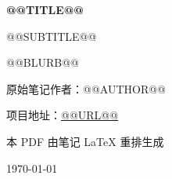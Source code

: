\documentclass[UTF8,11pt,openany,papersize=a4]{ctexbook}
\theoremstyle{definition}
\theoremstyle{plain}
\theoremstyle{remark}
\begin{document}
\begin{titlepage}
\centering
\vspace*{3cm}
{\Huge\bfseries\sffamily @@TITLE@@\par}
\vspace{0.8cm}
{\LARGE\sffamily @@SUBTITLE@@\par}
\vspace{1.5cm}
{\large @@BLURB@@\par}
\vfill
{\large 原始笔记作者：@@AUTHOR@@\par}
\vspace{0.3cm}
{\large 项目地址：\url{@@URL@@}\par}
\vspace{0.3cm}
{\large 本 PDF 由笔记 LaTeX 重排生成\par}
\vspace{0.8cm}
{\large \today\par}
\end{titlepage}

\frontmatter
\pagestyle{fancy}
\tableofcontents

\mainmatter


\end{document}
